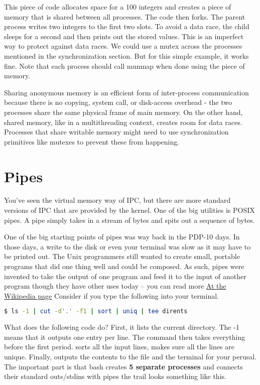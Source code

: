 This piece of code allocates space for a 100 integers and creates a piece of memory that is shared between all processes.
The code then forks.
The parent process writes two integers to the first two slots.
To avoid a data race, the child sleeps for a second and then prints out the stored values.
This is an imperfect way to protect against data races.
We could use a mutex across the processes mentioned in the synchronization section.
But for this simple example, it works fine.
Note that each process should call munmap when done using the piece of memory.
	 
Sharing anonymous memory is an efficient form of inter-process communication because there is no copying, system call, or disk-access overhead - the two processes share the same physical frame of main memory.
On the other hand, shared memory, like in a multithreading context, creates room for data races.
Processes that share writable memory might need to use synchronization primitives like mutexes to prevent these from happening.
	 
\section{Pipes}
	 
You've seen the virtual memory way of IPC, but there are more standard versions of IPC that are provided by the kernel.
One of the big utilities is POSIX pipes.
A pipe simply takes in a stream of bytes and spits out a sequence of bytes.
	 
One of the big starting points of pipes was way back in the PDP-10 days. In those days, a write to the disk or even your terminal was slow as it may have to be printed out.
The Unix programmers still wanted to create small, portable programs that did one thing well and could be composed.
As such, pipes were invented to take the output of one program
and feed it to the input of another program though they have other uses today -- you can read more \href{https://en.wikipedia.org/wiki/Pipeline\_\%28Unix\%29}{At the Wikipedia page}
Consider if you type the following into your terminal.
	 
\begin{lstlisting}[language=bash]
	$ ls -1 | cut -d'.' -f1 | sort | uniq | tee dirents
\end{lstlisting}
	 
What does the following code do?
First, it lists the current directory.
The -1 means that it outputs one entry per line.
The  command then takes everything before the first period.
 sorts all the input lines,  makes sure all the lines are unique.
Finally,  outputs the contents to the file  and the terminal for your perusal.
The important part is that bash creates \textbf{5 separate processes} and connects their standard outs/stdins with pipes the trail looks something like this.
	 

